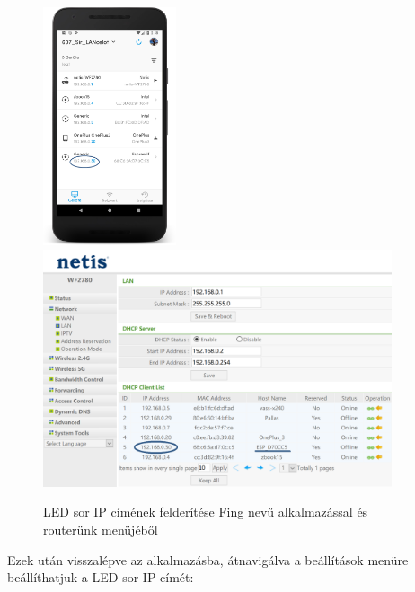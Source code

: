 \documentclass[../main.tex]{subfiles}
\begin{document}
            \begin{figure}[!h]
                \includegraphics[height=7cm]{android_res/screen_pictures/ip_addr_fing}
                \includegraphics[height=7cm]{android_res/screen_pictures/ip_addr_router}
                \caption{LED sor IP címének felderítése Fing nevű alkalmazással és routerünk menüjéből}
            \end{figure}

            Ezek után visszalépve az alkalmazásba, átnavigálva a beállítások menüre beállíthatjuk a LED sor IP címét:
            
\end{document}
